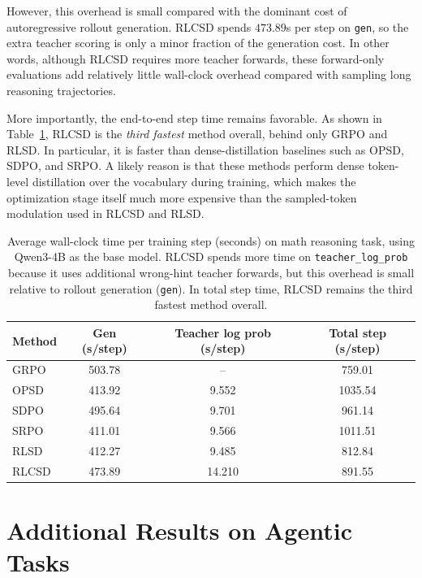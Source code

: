 However, this overhead is small compared with the dominant cost of autoregressive rollout generation. RLCSD spends \(473.89\)s per step on \texttt{gen}, so the extra teacher scoring is only a minor fraction of the generation cost. In other words, although RLCSD requires more teacher forwards, these forward-only evaluations add relatively little wall-clock overhead compared with sampling long reasoning trajectories.

More importantly, the end-to-end step time remains favorable. As shown in Table~\ref{tab:wall_clock}, RLCSD is the \emph{third fastest} method overall, behind only GRPO and RLSD. In particular, it is faster than dense-distillation baselines such as OPSD, SDPO, and SRPO. A likely reason is that these methods perform dense token-level distillation over the vocabulary during training, which makes the optimization stage itself much more expensive than the sampled-token modulation used in RLCSD and RLSD. 

\begin{table}[h]
\centering
\small
\caption{Average wall-clock time per training step (seconds) on math reasoning task, using Qwen3-4B as the base model. RLCSD spends more time on \texttt{teacher\_log\_prob} because it uses additional wrong-hint teacher forwards, but this overhead is small relative to rollout generation (\texttt{gen}). In total step time, RLCSD remains the third fastest method overall.}
\label{tab:wall_clock}
\begin{tabular}{lccc}
\toprule
Method & Gen (s/step) & Teacher log prob (s/step) & Total step (s/step) \\
\midrule
GRPO  & 503.78 & --     & 759.01  \\
OPSD  & 413.92 & 9.552  & 1035.54 \\
SDPO  & 495.64 & 9.701  & 961.14  \\
SRPO  & 411.01 & 9.566  & 1011.51 \\
RLSD  & 412.27 & 9.485  & 812.84  \\
RLCSD & 473.89 & 14.210 & 891.55  \\
\bottomrule
\end{tabular}
\end{table}

\section{Additional Results on Agentic Tasks}
\label{app:agentic}

